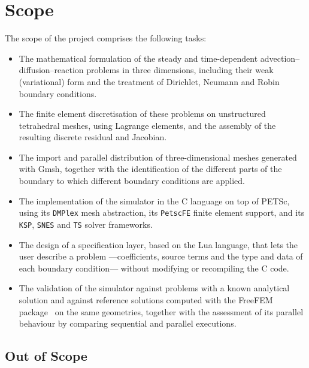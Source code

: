 \documentclass[GREVA,english,openany]{tfe-eseiaat}
\begin{document}
\chapter{Scope}

The scope of the project comprises the following tasks:

\begin{itemize}
    \item The mathematical formulation of the steady and time-dependent
    advection--diffusion--reaction problems in three dimensions, including
    their weak (variational) form and the treatment of Dirichlet, Neumann and
    Robin boundary conditions.

    \item The finite element discretisation of these problems on unstructured
    tetrahedral meshes, using Lagrange elements, and the assembly of the
    resulting discrete residual and Jacobian.

    \item The import and parallel distribution of three-dimensional meshes
    generated with Gmsh, together with the identification of the different
    parts of the boundary to which different boundary conditions are applied.

    \item The implementation of the simulator in the C language on top of
    PETSc, using its \texttt{DMPlex} mesh abstraction, its \texttt{PetscFE}
    finite element support, and its \texttt{KSP}, \texttt{SNES} and
    \texttt{TS} solver frameworks.

    \item The design of a specification layer, based on the Lua language, that
    lets the user describe a problem ---coefficients, source terms and the
    type and data of each boundary condition--- without modifying or
    recompiling the C code.

    \item The validation of the simulator against problems with a known
    analytical solution and against reference solutions computed with the
    FreeFEM package~\cite{freefem-manual} on the same geometries, together with
    the assessment of its parallel behaviour by comparing sequential and
    parallel executions.
\end{itemize}

\section*{Out of Scope}
\end{document}
